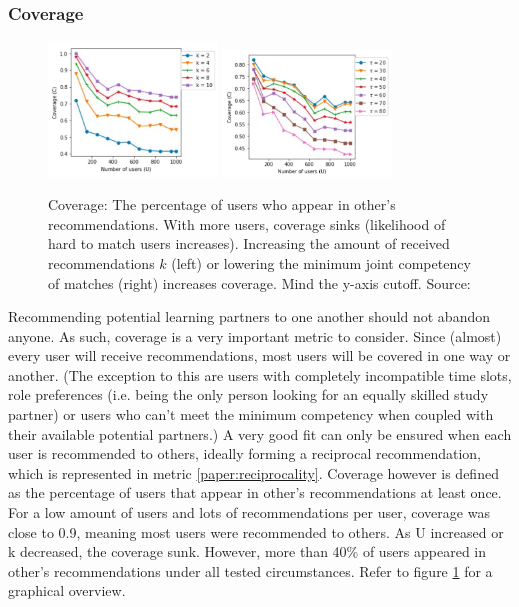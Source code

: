 \documentclass[conference]{IEEEtran}
\begin{document}
\subsubsection{Coverage} \label{paper:coverage}
\begin{figure}[!t]
	\centering
	\includegraphics[width=0.4\textwidth]{g/CoverageUk.PNG}
	\includegraphics[width=0.4\textwidth]{g/CoverageUT.PNG}
	\caption{Coverage: The percentage of users who appear in other's recommendations. With more users, coverage sinks (likelihood of hard to match users increases). Increasing the amount of received recommendations \(k\) (left) or lowering the minimum joint competency of matches (right) increases coverage. Mind the y-axis cutoff. Source: \cite{potts2018reciprocal}}
	\label{f:coverage}
\end{figure}
Recommending potential learning partners to one another should not abandon anyone. As such, coverage is a very important metric to consider. Since (almost) every user will receive recommendations, most users will be covered in one way or another. (The exception to this are users with completely incompatible time slots, role preferences (i.e. being the only person looking for an equally skilled study partner) or users who can't meet the minimum competency when coupled with their available potential partners.) A very good fit can only be ensured when each user is recommended to others, ideally forming a reciprocal recommendation, which is represented in metric \ref{paper:reciprocality}. Coverage however is defined as the percentage of users that appear in other's recommendations at least once.\\
For a low amount of users and lots of recommendations per user, coverage was close to 0.9, meaning most users were recommended to others. As U increased or k decreased, the coverage sunk. However, more than 40\% of users appeared in other's recommendations under all tested circumstances. Refer to figure \ref{f:coverage} for a graphical overview.\\
\end{document}
